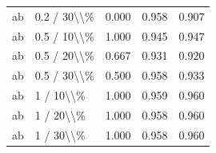 \begin{table}[!h]
\begin{tabular}[t]{llccc}
\addlinespace
ab & 0.2 / 30\textbackslash{}\textbackslash{}\% & 0.000 & 0.958 & 0.907\\
ab & 0.5 / 10\textbackslash{}\textbackslash{}\% & 1.000 & 0.945 & 0.947\\
ab & 0.5 / 20\textbackslash{}\textbackslash{}\% & 0.667 & 0.931 & 0.920\\
ab & 0.5 / 30\textbackslash{}\textbackslash{}\% & 0.500 & 0.958 & 0.933\\
ab & 1 / 10\textbackslash{}\textbackslash{}\% & 1.000 & 0.959 & 0.960\\
\addlinespace
ab & 1 / 20\textbackslash{}\textbackslash{}\% & 1.000 & 0.958 & 0.960\\
ab & 1 / 30\textbackslash{}\textbackslash{}\% & 1.000 & 0.958 & 0.960\\
\bottomrule
\end{tabular}
\end{table}
